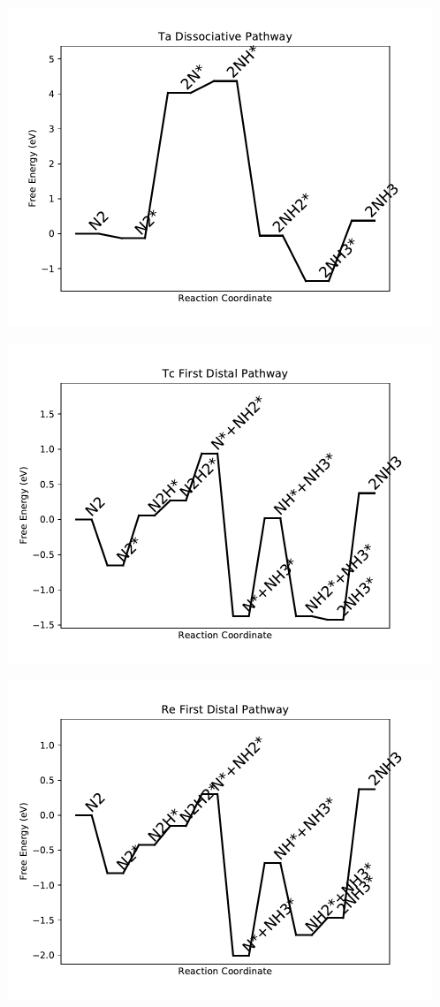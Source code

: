 \begin{figure}
\centering
\includegraphics[width=0.8\linewidth]{data/plots/Ta_dissociative.pdf}
\end{figure}

\begin{figure}
\centering
\includegraphics[width=0.8\linewidth]{data/plots/Tc_distal_1.pdf}
\end{figure}

\begin{figure}
\centering
\includegraphics[width=0.8\linewidth]{data/plots/Re_distal_1.pdf}
\end{figure}

